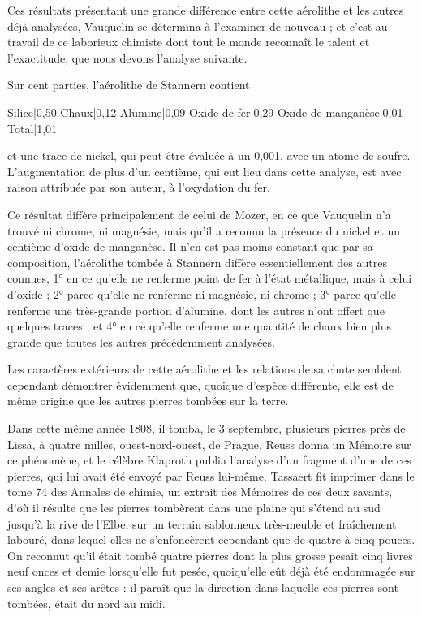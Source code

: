 \documentclass[a4paper, 12pt, oneside, french]{article}
\begin{document}
Ces résultats présentant une grande différence entre cette aérolithe et les autres déjà analysées, Vauquelin se détermina à l'examiner de nouveau ; et c'est au travail de ce laborieux chimiste dont tout le monde reconnaît le talent et l'exactitude, que nous devons l'analyse suivante.

Sur cent parties, l'aérolithe de Stannern contient

Silice|0,50  
Chaux|0,12  
Alumine|0,09  
Oxide de fer|0,29  
Oxide de manganèse|0,01  
Total|1,01

et une trace de nickel, qui peut être évaluée à un 0,001, avec un atome de soufre. L'augmentation de plus d'un centième, qui eut lieu dans cette analyse, est avec raison attribuée par son auteur, à l'oxydation du fer.

Ce résultat diffère principalement de celui de Mozer, en ce que Vauquelin n'a trouvé ni chrome, ni magnésie, mais qu'il a reconnu la présence du nickel et un centième d'oxide de manganèse. Il n'en est pas moins constant que par sa composition, l'aérolithe tombée à Stannern diffère essentiellement des autres connues, 1° en ce qu'elle ne renferme point de fer à l'état métallique, mais à celui d'oxide ; 2° parce qu'elle ne renferme ni magnésie, ni chrome ; 3° parce qu'elle renferme une très-grande portion d'alumine, dont les autres n'ont offert que quelques traces ; et 4° en ce qu'elle renferme une quantité de chaux bien plus grande que toutes les autres précédemment analysées.

Les caractères extérieurs de cette aérolithe et les relations de sa chute semblent cependant démontrer évidemment que, quoique d'espèce différente, elle est de même origine que les autres pierres tombées sur la terre.

Dans cette même année 1808, il tomba, le 3 septembre, plusieurs pierres près de Lissa, à quatre milles, ouest-nord-ouest, de Prague. Reuss donna un Mémoire sur ce phénomène, et le célèbre Klaproth publia l'analyse d'un fragment d'une de ces pierres, qui lui avait été envoyé par Reuss lui-même. Tassaert fit imprimer dans le tome 74 des Annales de chimie, un extrait des Mémoires de ces deux savants, d'où il résulte que les pierres tombèrent dans une plaine qui s'étend au sud jusqu'à la rive de l'Elbe, sur un terrain sablonneux très-meuble et fraîchement labouré, dans lequel elles ne s'enfoncèrent cependant que de quatre à cinq pouces. On reconnut qu'il était tombé quatre pierres dont la plus grosse pesait cinq livres neuf onces et demie lorsqu'elle fut pesée, quoiqu'elle eût déjà été endommagée sur ses angles et ses arêtes : il paraît que la direction dans laquelle ces pierres sont tombées, était du nord au midi.
\end{document}
